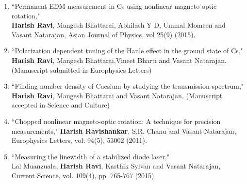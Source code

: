 \publications

\begin{enumerate}
\item ``Permanent EDM measurement in Cs using nonlinear magneto-optic rotation," \\
\textbf{Harish Ravi}, Mangesh Bhattarai, Abhilash Y D, Ummal Momeen and Vasant Natarajan, Asian Journal of Physics, vol 25(9) (2015).


	\item ``Polarization dependent tuning of the Hanle effect in the ground state of Cs," 
	\textbf{Harish Ravi}, Mangesh Bhattarai,Vineet Bharti and Vasant Natarajan.(Manuscript submitted in Europhysics Letters)
	\item ``Finding number density of Caesium by studying the transmission spectrum,"\\
	\textbf{Harish Ravi}, Mangesh Bhattarai and Vasant Natarajan. (Manuscript accepted in Science and Culture)

\item ``Chopped nonlinear magneto-optic rotation: A technique for precision measurements," 
\textbf{Harish Ravishankar}, S.R. Chanu and Vasant Natarajan, Europhysics Letters, vol. 94(5), 53002 (2011).

\item ``Measuring the linewidth of a stabilized diode laser," \\
Lal Muanzuala, \textbf{Harish Ravi}, Karthik Sylvan and Vasant Natarajan, Current Science,  vol. 109(4), pp. 765-767 (2015).
\end{enumerate}


